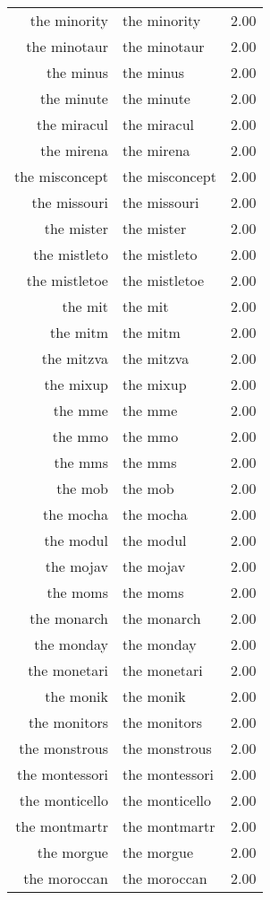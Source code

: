 \begin{table}[ht]
\begin{tabular}{rlr}
  the minority & the minority & 2.00 \\ 
  the minotaur & the minotaur & 2.00 \\ 
  the minus & the minus & 2.00 \\ 
  the minute & the minute & 2.00 \\ 
  the miracul & the miracul & 2.00 \\ 
  the mirena & the mirena & 2.00 \\ 
  the misconcept & the misconcept & 2.00 \\ 
  the missouri & the missouri & 2.00 \\ 
  the mister & the mister & 2.00 \\ 
  the mistleto & the mistleto & 2.00 \\ 
  the mistletoe & the mistletoe & 2.00 \\ 
  the mit & the mit & 2.00 \\ 
  the mitm & the mitm & 2.00 \\ 
  the mitzva & the mitzva & 2.00 \\ 
  the mixup & the mixup & 2.00 \\ 
  the mme & the mme & 2.00 \\ 
  the mmo & the mmo & 2.00 \\ 
  the mms & the mms & 2.00 \\ 
  the mob & the mob & 2.00 \\ 
  the mocha & the mocha & 2.00 \\ 
  the modul & the modul & 2.00 \\ 
  the mojav & the mojav & 2.00 \\ 
  the moms & the moms & 2.00 \\ 
  the monarch & the monarch & 2.00 \\ 
  the monday & the monday & 2.00 \\ 
  the monetari & the monetari & 2.00 \\ 
  the monik & the monik & 2.00 \\ 
  the monitors & the monitors & 2.00 \\ 
  the monstrous & the monstrous & 2.00 \\ 
  the montessori & the montessori & 2.00 \\ 
  the monticello & the monticello & 2.00 \\ 
  the montmartr & the montmartr & 2.00 \\ 
  the morgue & the morgue & 2.00 \\ 
  the moroccan & the moroccan & 2.00 \\ 

\end{tabular}
\end{table}

